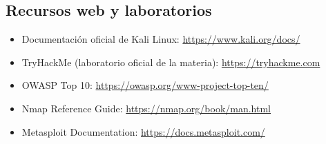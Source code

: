\documentclass[11pt,a4paper]{article}
\begin{document}
\subsection{Recursos web y laboratorios}
\begin{itemize}[leftmargin=*]
  \item Documentación oficial de Kali Linux: \url{https://www.kali.org/docs/}
  \item TryHackMe (laboratorio oficial de la materia): \url{https://tryhackme.com}
  \item OWASP Top 10: \url{https://owasp.org/www-project-top-ten/}
  \item Nmap Reference Guide: \url{https://nmap.org/book/man.html}
  \item Metasploit Documentation: \url{https://docs.metasploit.com/}
\end{itemize}
\end{document}
